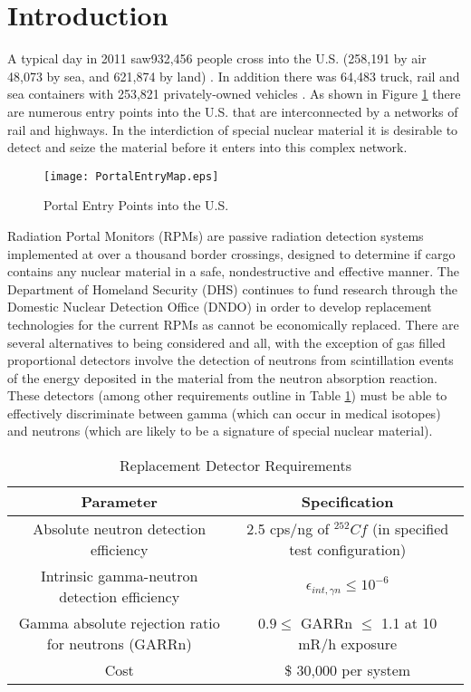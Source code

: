 \section{Introduction}
A typical day in 2011 saw932,456 people cross into the U.S. (258,191 by air 48,073 by sea, and 621,874 by land) \cite{cpb_typical_2012}.
In addition there was 64,483 truck, rail and sea containers with 253,821 privately-owned vehicles \cite{cpb_typical_2012}.
As shown in Figure \ref{fig:PortalEntryMap} there are numerous entry points into the U.S. that are interconnected by a networks of rail and highways.
In the interdiction of special nuclear material it is desirable to detect and seize the material before it enters into this complex network.
\begin{figure}
    \texttt{[image: PortalEntryMap.eps]}
    \label{fig:PortalEntryMap}
	\caption{Portal Entry Points into the U.S.}
\end{figure}
Radiation Portal Monitors (RPMs) are passive radiation detection systems implemented at over a thousand border crossings, designed to determine if cargo contains any nuclear material in a safe, nondestructive and effective manner\cite{kouzes_neutron_2010}.
The Department of Homeland Security (DHS) continues to fund research through the Domestic Nuclear Detection Office (DNDO) in order to develop replacement technologies for the current  RPMs as  cannot be economically replaced.
There are several alternatives to  being considered and all, with the exception of gas filled proportional detectors involve the detection of neutrons from scintillation events of the energy deposited in the material from the neutron absorption reaction.
These detectors (among other requirements outline in Table \ref{tab:DHSCriteria}) must be able to effectively discriminate between gamma (which can occur in medical isotopes) and neutrons (which are likely to be a signature of special nuclear material).
\begin{table}
	\centering
    \caption{Replacement Detector Requirements \protect\cite{kouzes_neutron_1999}}
	\begin{tabular}{c c }
	Parameter & Specification \\
	\hline
	\hline
	Absolute neutron detection efficiency & 2.5 cps/ng of ${}^{252}Cf$ (in specified test configuration) \\
	Intrinsic gamma-neutron detection efficiency & $ \epsilon_{int,\gamma n}\leq 10^{-6}$ \\
	Gamma absolute rejection ratio for neutrons (GARRn) & $ 0.9 \leq \text{ GARRn }\leq$ 1.1 at 10 mR/h exposure \\
	Cost &  \$ 30,000 per system \\
	\hline
	\end{tabular}
    \label{tab:DHSCriteria}
\end{table}


